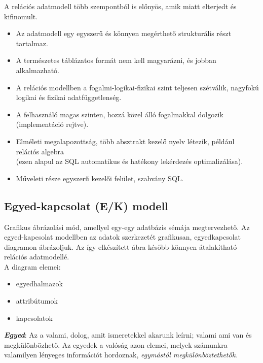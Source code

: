 \documentclass[tikz,12pt,margin=0px]{article}
\begin{document}
    {\small
    \noindent A relációs adatmodell több szempontból is előnyös, amik miatt elterjedt és kifinomult.
        \begin{itemize}
            \item Az adatmodell egy egyszerű és könnyen megérthető strukturális részt tartalmaz.
            \item A természetes táblázatos formát nem kell magyarázni, és jobban alkalmazható.
            \item A relációs modellben a fogalmi-logikai-fizikai szint teljesen szétválik, nagyfokú logikai és fizikai adatfüggetlenség.
            \item A felhasználó magas szinten, hozzá közel álló fogalmakkal dolgozik (implementáció rejtve).
            \item Elméleti megalapozottság, több absztrakt kezelő nyelv létezik, például relációs algebra\\
            (ezen alapul az SQL automatikus és hatékony lekérdezés optimalizálása).
            \item Műveleti része egyszerű kezelői felület, szabvány SQL.
        \end{itemize}	
    }

	\subsection*{Egyed-kapcsolat (E/K) modell\\}
	
    \noindent Grafikus ábrázolási mód, amellyel egy-egy adatbázis sémája megtervezhető. Az egyed-kapcsolat modellben az adatok szerkezetét grafikusan, egyedkapcsolat diagramon ábrázoljuk. Az így elkészített ábra később könnyen átalakítható relációs adatmodellé. \\

    \noindent A diagram elemei:
    \begin{itemize}
        \item egyedhalmazok
        \item attribútumok
        \item kapcsolatok\\
    \end{itemize}

    \noindent \textbf{\emph{Egyed}}: Az a valami, dolog, amit ismeretekkel akarunk leírni; valami ami van és megkülönbözhető. Az egyedek a valóság azon elemei, melyek számunkra valamilyen lényeges információt hordoznak, \emph{egymástól megkülönböztethetők}.\\
\end{document}
